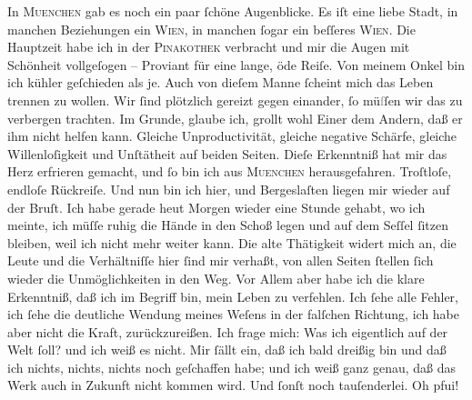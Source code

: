 \pstart
           In \textsc{Muenchen} gab es noch ein paar ſchöne Augenblicke. Es iſt eine liebe Stadt, in {\pb}manchen Beziehungen ein \textsc{Wien}, in manchen ſogar ein beſſeres \textsc{Wien}. Die Hauptzeit habe ich in der \textsc{Pinakothek} verbracht und mir die Augen mit Schönheit vollgeſogen – Proviant für eine
               lange, öde Reiſe.  Von meinem
                  Onkel bin ich kühler
               geſchieden als je. Auch von dieſem Manne ſcheint mich das Leben trennen zu wollen. Wir ſind plötzlich gereizt
               gegen einander, ſo mü\textcolor{gray}{ſ}ſen wir das zu verbergen trachten. Im
               Grunde, glaube ich, grollt wohl Einer dem Andern, daß er ihm nicht helfen kann.
               Gleiche Unproductivität, gleiche negative Schärfe, gleiche Willenloſigkeit und
               Unſtätheit auf beiden Seiten. Dieſe Erkenntniß hat mir das Herz erfrieren gemacht,
               und ſo bin ich aus \textsc{Muenchen} herausgefahren. Troſtloſe, endloſe Rückreiſe. {\pb}Und nun bin ich hier, und Bergeslaſten liegen mir wieder auf der Bruſt. Ich habe
               gerade heut{ }Morgen wieder eine Stunde gehabt, wo ich meinte, ich müſſe ruhig die
               Hände in den Schoß legen und auf dem Seſſel ſitzen bleiben, weil ich nicht mehr
               weiter kann. Die alte Thätigkeit widert mich an, die Leute und die Verhältniſſe hier
               ſind mir verhaßt, von allen Seiten ſtellen ſich wieder die Unmöglichkeiten in den
               Weg. Vor Allem  aber habe ich  die klare Erkenntniß, daß
               ich im Begriff bin, mein Leben zu verfehlen. Ich ſehe alle Fehler, ich ſehe die
               deutliche \strikeout{\textcolor{gray}{W}} Wendung meines Weſens in der falſchen Richtung, ich {\pb}habe aber nicht die Kraft, zurückzureißen. Ich frage
               mich: Was ich eigentlich auf der Welt ſoll? und ich weiß es nicht. Mir ſällt ein, daß
               ich bald dreißig bin und daß ich nichts, nichts, nichts noch geſchaffen habe; und ich
               weiß ganz genau, daß das Werk auch in Zukunft nicht kommen wird. Und ſonſt noch
               tauſenderlei. Oh pfui! {\dotsfive}\pend
           
